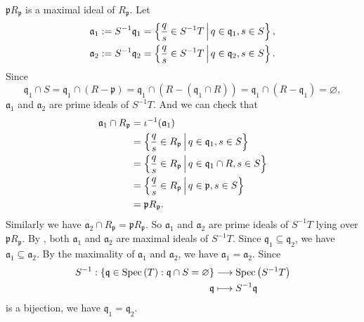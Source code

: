 \begin{prf}
\begin{enumerate}[(i)]
        $\mathfrak{p}R_\mathfrak{p}$ is a maximal ideal of $R_\mathfrak{p}$. Let 
        \begin{align*}
            \mathfrak{a}_1&:=S^{-1}\mathfrak{q}_1=\left\{\frac{q}{s}\in S^{-1}T\,\middle\vert\, q\in \mathfrak{q}_1, s\in S\right\},\\
            \mathfrak{a}_2&:=S^{-1}\mathfrak{q}_2=\left\{\frac{q}{s}\in S^{-1}T\,\middle\vert\, q\in \mathfrak{q}_2, s\in S\right\}.
        \end{align*}
        Since 
        \[
            \mathfrak{q}_1\cap S=\mathfrak{q}_1\cap (R-\mathfrak{p})=\mathfrak{q}_1\cap(R-(\mathfrak{q}_1\cap R))=\mathfrak{q}_1\cap\left(R-\mathfrak{q}_1\right)=\varnothing,
        \]
        $\mathfrak{a}_1$ and $\mathfrak{a}_2$ are prime ideals of $S^{-1}T$. And we can check that
        \begin{align*}
            \mathfrak{a}_1\cap R_\mathfrak{p}&=\iota^{-1}(\mathfrak{a}_1)\\
            &=\left\{\frac{q}{s}\in R_\mathfrak{p}\,\middle\vert\, q\in \mathfrak{q}_1, s\in S\right\}\\
            &=\left\{\frac{q}{s}\in R_\mathfrak{p}\,\middle\vert\, q\in \mathfrak{q}_1\cap R, s\in S\right\}\\
            &=\left\{\frac{q}{s}\in R_\mathfrak{p}\,\middle\vert\, q\in \mathfrak{p}, s\in S\right\}\\
            &=\mathfrak{p}R_\mathfrak{p}.
        \end{align*}
        Similarly we have $\mathfrak{a}_2\cap R_\mathfrak{p}=\mathfrak{p}R_\mathfrak{p}$. So $\mathfrak{a}_1$ and $\mathfrak{a}_2$ are prime ideals of $S^{-1}T$ lying over $\mathfrak{p}R_\mathfrak{p}$. By , both $\mathfrak{a}_1$ and $\mathfrak{a}_2$ are maximal ideals of $S^{-1}T$. Since $\mathfrak{q}_1\subseteq \mathfrak{q}_2$, we have $\mathfrak{a}_1\subseteq \mathfrak{a}_2$. By the maximality of $\mathfrak{a}_1$ and $\mathfrak{a}_2$, we have $\mathfrak{a}_1=\mathfrak{a}_2$. Since 
        \begin{align*}
            S^{-1}:\left\{\mathfrak{q} \in \operatorname{Spec}\left(T\right): \mathfrak{q} \cap S=\varnothing\right\} &\longrightarrow
           \operatorname{Spec}\left(S^{-1}T\right)\\
            \mathfrak{q} &\longmapsto S^{-1}\mathfrak{q}
        \end{align*}
        is a bijection, we have $\mathfrak{q}_1=\mathfrak{q}_2$.\\
    \end{enumerate}
\end{prf}

